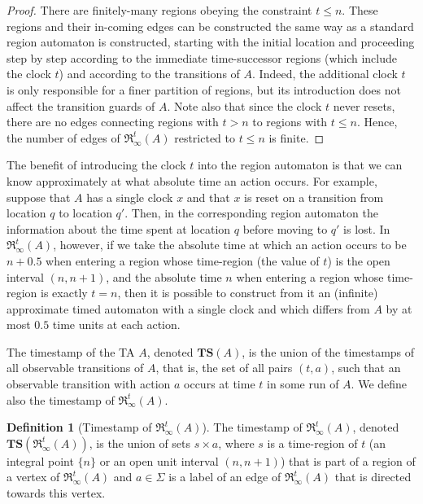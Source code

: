 \documentclass[11pt]{amsart}
\theoremstyle{definition}
\newtheorem{definition}[theorem]{Definition}
\newcommand{\IARRR}{\mathfrak{R}_{\infty}^{t}}
\newcommand{\TTTSSS}{\mathbf{TS}}
\begin{document}
\begin{proof}
	There are finitely-many regions obeying the constraint $t \leq n$.
	These regions and their in-coming edges can be constructed the same way as a standard region automaton is constructed, starting with the initial location and proceeding step by step according to the immediate time-successor regions (which include the clock $t$) and according to the transitions of $A$.
	Indeed, the additional clock $t$ is only responsible for a finer partition of regions, but its introduction does not affect the transition guards of $A$.  
	Note also that since the clock $t$ never resets, there are no edges connecting regions with $t > n$ to regions with $t \leq n$.
	Hence, the number of edges of $\IARRR(A)$ restricted to $t \leq n$ is finite.   
\end{proof}

The benefit of introducing the clock $t$ into the region automaton is that we can know approximately at what absolute time an action occurs. 
For example, suppose that $A$ has a single clock $x$ and that $x$ is reset on a transition from location $q$ to location $q'$.
Then, in the corresponding region automaton the information about the time spent at location $q$ before moving to $q'$ is lost.
In $\IARRR(A)$, however, if we take the absolute time at which an action occurs to be $n+0.5$ when entering a region whose time-region (the value of $t$) is the open interval $(n, n+1)$, and the absolute time $n$ when entering a region whose time-region is exactly $t = n$, then it is possible to construct from it an (infinite) approximate timed automaton with a single clock and which differs from $A$ by at most $0.5$ time units at each action.

The timestamp of the TA $A$, denoted $\TTTSSS(A)$, is the union of the timestamps of all observable transitions of $A$, that is, the set of all pairs $(t,a)$, such that an observable transition with action $a$ occurs at time $t$ in some run of $A$.
We define also the timestamp of $\IARRR(A)$.
\begin{definition}[Timestamp of $\IARRR(A)$]
	The timestamp of $\IARRR(A)$, denoted $\TTTSSS(\IARRR(A))$, is the union of sets $s \times a$, where $s$ is a time-region of $t$ (an integral point $\{n\}$ or an open unit interval $(n,n+1)$) that is part of a region of a vertex of $\IARRR(A)$ and $a \in \Sigma$ is a label of an edge of $\IARRR(A)$ that is directed towards this vertex.
\end{definition}
\end{document}

